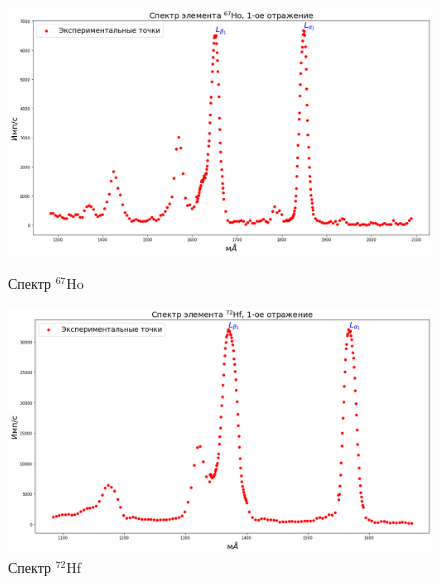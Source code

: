 \documentclass[a4paper, 12pt]{article}%
\begin{document}
		\begin{figure}[h!]
			\begin{minipage}[h]{0.49\textwidth}
				\begin{center}
					\includegraphics[width=1.02\linewidth]{Спектры/Ho.png}
					\caption{Спектр $^{67}$Ho}
				\end{center}
			\end{minipage}
			\hfill
			\begin{minipage}[h]{0.49\textwidth}
				\begin{center}
					\includegraphics[width=1.02\linewidth]{Спектры/Hf.png}
					\caption{Спектр $^{72}$Hf}
				\end{center}
			\end{minipage}
		\end{figure}
\end{document}
